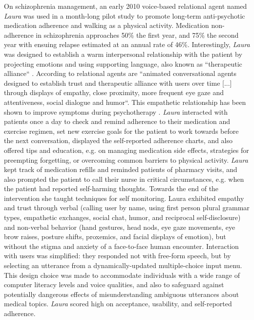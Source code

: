 On schizophrenia management, an early 2010 voice-based relational agent named \textit{Laura} was used in a month-long pilot study to promote long-term anti-psychotic medication adherence and walking as a physical activity. Medication non-adherence in schizophrenia approaches 50\% the first year, and 75\% the second year with ensuing relapse estimated at an annual rate of 46\%. Interestingly, \textit{Laura} was designed to establish a warm interpersonal relationship with the patient by projecting emotions and using supporting language, also known as ``therapeutic alliance`` \cite{schizophrenia2010}. According to \citeauthor{bickmoreetalrealtionalfordepression2010} relational agents are ``animated conversational agents designed to establish trust and therapeutic alliance with users over time [...] through displays of empathy, close proximity, more frequent eye gaze and attentiveness, social dialogue and humor``. This empathetic relationship has been shown to improve symptoms during psychotherapy \cite{aipsychotherapy2019}. \textit{Laura} interacted with patients once a day to check and remind adherence to their medication and exercise regimen, set new exercise goals for the patient to work towards before the next conversation, displayed the self-reported adherence charts, and also offered tips and education, e.g. on managing medication side effects, strategies for preempting forgetting, or overcoming common barriers to physical activity. \textit{Laura} kept track of medication refills and reminded patients of pharmacy visits, and also prompted the patient to call their nurse in critical circumstances, e.g. when the patient had reported self-harming thoughts. Towards the end of the intervention she taught techniques for self monitoring. Laura exhibited empathy and trust through verbal (calling user by name, using first person plural grammar types, empathetic exchanges, social chat, humor, and reciprocal self-disclosure) and non-verbal behavior (hand gestures, head nods, eye gaze movements, eye brow raises, posture shifts, proxemics, and facial displays of emotion), but without the stigma and anxiety of a face-to-face human encounter. Interaction with users was simplified: they responded not with free-form speech, but by selecting an utterance from a dynamically-updated multiple-choice input menu. This design choice was made to accommodate individuals with a wide range of computer literacy levels and voice qualities, and also to safeguard against potentially dangerous effects of misunderstanding ambiguous utterances about medical topics. \textit{Laura} scored high on acceptance, usability, and self-reported adherence. 

